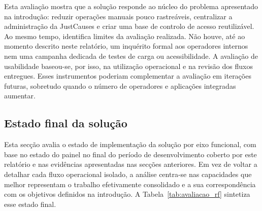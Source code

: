 Esta avaliação mostra que a solução responde ao núcleo do problema apresentado na introdução: reduzir operações manuais pouco rastreáveis, centralizar a administração da JustCauses e criar uma base de controlo de acesso reutilizável. Ao mesmo tempo, identifica limites da avaliação realizada. Não houve, até ao momento descrito neste relatório, um inquérito formal aos operadores internos nem uma campanha dedicada de testes de carga ou acessibilidade. A avaliação de usabilidade baseou-se, por isso, na utilização operacional e na revisão dos fluxos entregues. Esses instrumentos poderiam complementar a avaliação em iterações futuras, sobretudo quando o número de operadores e aplicações integradas aumentar.

\subsection{Estado final da solução}
\label{subsec:estado_final_solucao}

Esta secção avalia o estado de implementação da solução por eixo funcional, com base no estado do painel no final do período de desenvolvimento coberto por este relatório e nas evidências apresentadas nas secções anteriores. Em vez de voltar a detalhar cada fluxo operacional isolado, a análise centra-se nas capacidades que melhor representam o trabalho efetivamente consolidado e a sua correspondência com os objetivos definidos na introdução. A Tabela~\ref{tab:avaliacao_rf} sintetiza esse estado final.

